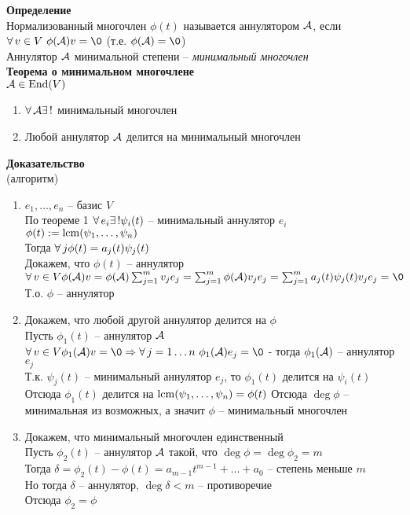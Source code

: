 \documentclass[12pt]{article}
\begin{document}
\textbf{Определение}\\
Нормализованный многочлен $\phi(t)$ называется аннулятором $\mathcal{A}$, если $\fall v \in V\ \phi(\mcA)v = \0$ (т.е. $\phi(\mcA) = \0$)\\
Аннулятор $\mathcal{A}$ минимальной степени -- \textit{минимальный многочлен}\\
\textbf{Теорема о минимальном многочлене}\\
$\mathcal{A} \in \operatorname{End}(V)$
\begin{enumerate}
    \item $\forall\, \mathcal{A} \exists\,!$ минимальный многочлен
    \item Любой аннулятор $\mathcal{A}$ делится на минимальный многочлен
\end{enumerate}
\textbf{Доказательство}\\
(алгоритм)
\begin{enumerate}
    \item $e_1, \ldots, e_n$ -- базис $V$\\
    По теореме 1 $\forall\, e_i \exists\,! \psi_i(t)$ -- минимальный аннулятор $e_i$\\
    $\phi(t) := \operatorname{lcm} (\psi_1, \ldots, \psi_n)$\\
    Тогда $\forall\, j \phi(t) = a_j(t)\psi_j(t)$\\
    Докажем, что $\phi(t)$ -- аннулятор\\
    $\fall v \in V \phi(\mcA)v = \phi(\mcA) \sum_{j=1}^m v_j e_j = \sum_{j=1}^m \phi(\mcA) v_j e_j = \sum_{j=1}^m a_j(t)\psi_j(t) v_j e_j = \0$\\
    Т.о. $\phi$ -- аннулятор
    \item Докажем, что любой другой аннулятор делится на $\phi$\\
    Пусть $\phi_1(t)$ -- аннулятор $\mathcal{A}$\\
    $\fall v \in V \phi_1(\mcA)v = \0 \Rto \fall j=1\ldots n\ \phi_1(\mcA)e_j=\0$ - тогда $\phi_1(\mathcal{A})$ -- аннулятор $e_j$\\
    Т.к. $\psi_j(t)$ -- минимальный аннулятор $e_j$, то $\phi_1(t)$ делится на $\psi_i(t)$\\
    Отсюда $\phi_1(t)$ делится на $\operatorname{lcm}(\psi_1, \ldots, \psi_n) = \phi(t)$
    Отсюда $\deg \phi$ -- минимальная из возможных, а значит $\phi$ -- минимальный многочлен
    \item Докажем, что минимальный многочлен единственный\\
    Пусть $\phi_2(t)$ -- аннулятор $\mathcal{A}$ такой, что $\deg \phi = \deg \phi_2 = m$\\
    Тогда $\delta = \phi_2(t) - \phi(t) = a_{m-1}t^{m-1} + \ldots + a_0$ -- степень меньше $m$\\
    Но тогда $\delta$ -- аннулятор, $\deg \delta < m$ -- противоречие\\
    Отсюда $\phi_2 = \phi$\\
\end{enumerate}
\end{document}
